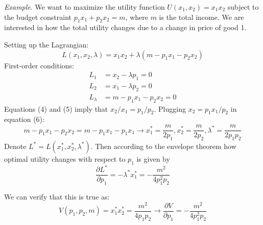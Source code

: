 \documentclass{./../Latex/handout}
\begin{document}
\textit{Example}. We want to maximize the utility function $U(x_1,x_2)=x_1 x_2$ subject to the budget constraint $p_1 x_1 + p_2 x_2 = m$, where $m$ is the total income. We are interested in how the total utility changes due to a change in price of good 1. 

Setting up the Lagrangian: 
$$
L(x_1,x_2,\lambda) =x_1 x_2 + \lambda(m-p_1x_1-p_2x_2)
$$
First-order conditions:
\begin{align}
	L_{1} &= x_2-\lambda p_1=0 \\
	L_{2} &= x_1-\lambda p_2=0 \\
	L_{\lambda} &= m-p_1x_1-p_2x_2 = 0
\end{align}
Equations (4) and (5) imply that $x_2/x_1 = p_1/p_2$. Plugging $x_2 = p_1x_1/p_2$ in equation (6):
$$m-p_1x_1-p_2x_2 = m-p_1x_1-p_1x_1 \rightarrow x_1^*=\frac{m}{2p_1},x_2^*=\frac{m}{2p_2}, \lambda^* = \frac{m}{2p_1 p_2}  $$
Denote $L^*=L(x_1^*,x_2^*,\lambda^*)$. Then according to the envelope theorem how optimal utility changes with respect to $p_1$ is given by $$ \frac{\partial L^*}{\partial p_1} = -\lambda^* x_1^* = - \frac{m^2}{4p_1^2 p_2}$$

We can verify that this is true as:
$$ V(p_1,p_2,m) = x_1^* x_2^* = \frac{m^2}{4p_1 p_2} \rightarrow \frac{\partial V}{\partial p_1} = - \frac{m^2}{4p_1^2 p_2}$$
\end{document}
